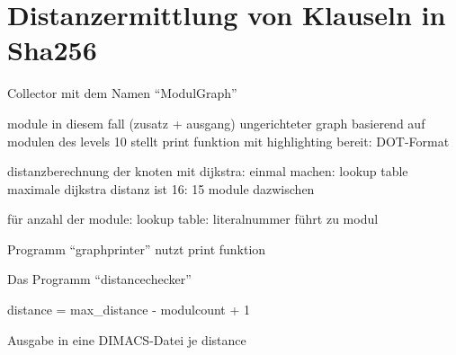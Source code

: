 \section{Distanzermittlung von Klauseln in Sha256}
\label{sec:ana:distance}

Collector mit dem Namen "`ModulGraph"'

module in diesem fall (zusatz + ausgang)
ungerichteter graph
basierend auf modulen des levels 10
stellt print funktion mit highlighting bereit: DOT-Format

distanzberechnung der knoten mit dijkstra: einmal machen: lookup table
maximale dijkstra distanz ist 16: 15 module dazwischen

für anzahl der module: lookup table: literalnummer führt zu modul



Programm "`graphprinter"' nutzt print funktion



Das Programm "`distancechecker"'

distance = max\_distance - modulcount + 1

Ausgabe in eine DIMACS-Datei je distance

